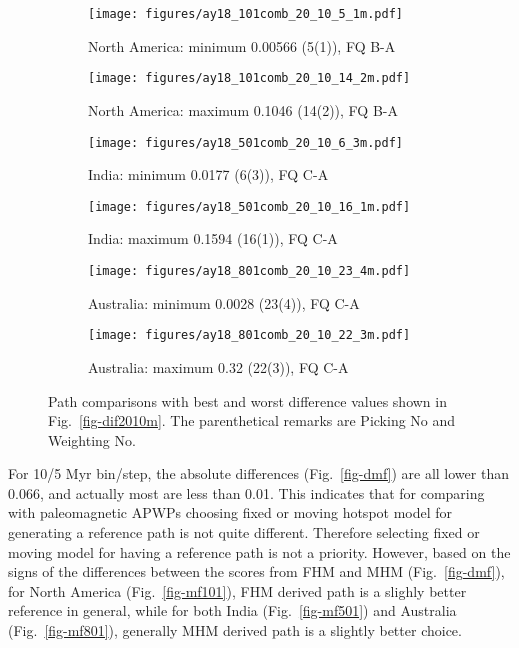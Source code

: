\begin{figure*}
	\centering
	\begin{subfigure}{.43\textwidth}
		\texttt{[image: figures/ay18\_101comb\_20\_10\_5\_1m.pdf]}
		\caption{North America: minimum 0.00566 (5(1)), FQ B-A}
	\end{subfigure}
	\begin{subfigure}{.43\textwidth}
		\texttt{[image: figures/ay18\_101comb\_20\_10\_14\_2m.pdf]}
		\caption{North America: maximum 0.1046 (14(2)), FQ B-A}
	\end{subfigure}
	\vspace{.1em}
	\begin{subfigure}{.43\textwidth}
		\texttt{[image: figures/ay18\_501comb\_20\_10\_6\_3m.pdf]}
		\caption{India: minimum 0.0177 (6(3)), FQ C-A}
	\end{subfigure}
	\begin{subfigure}{.43\textwidth}
		\texttt{[image: figures/ay18\_501comb\_20\_10\_16\_1m.pdf]}
		\caption{India: maximum 0.1594 (16(1)), FQ C-A}
	\end{subfigure}
	\vspace{.1em}
	\begin{subfigure}{.43\textwidth}
		\texttt{[image: figures/ay18\_801comb\_20\_10\_23\_4m.pdf]}
		\caption{Australia: minimum 0.0028 (23(4)), FQ C-A}
	\end{subfigure}
	\begin{subfigure}{.43\textwidth}
		\texttt{[image: figures/ay18\_801comb\_20\_10\_22\_3m.pdf]}
		\caption{Australia: maximum 0.32 (22(3)), FQ C-A}
	\end{subfigure}
	\caption[Best and worst differences (20 Myr bin, 10 Myr
step)]{Path comparisons with best and worst difference values shown in
Fig.~\ref{fig-dif2010m}. The parenthetical remarks are Picking No and Weighting No.}\label{fig-dif2010bwm}
\end{figure*}

For 10/5 Myr bin/step, the absolute differences (Fig.~\ref{fig-dmf}) are all
lower than 0.066, and actually most are less than 0.01. This indicates that for
comparing with paleomagnetic APWPs choosing fixed or moving hotspot model for
generating a reference path is not quite different. Therefore selecting fixed or
moving model for having a reference path is not a priority. However, based on
the signs of the differences between the scores from FHM and MHM
(Fig.~\ref{fig-dmf}), for North America (Fig.~\ref{fig-mf101}), FHM derived path
is a slighly better reference in general, while for both India
(Fig.~\ref{fig-mf501}) and Australia (Fig.~\ref{fig-mf801}), generally MHM
derived path is a slightly better choice.

